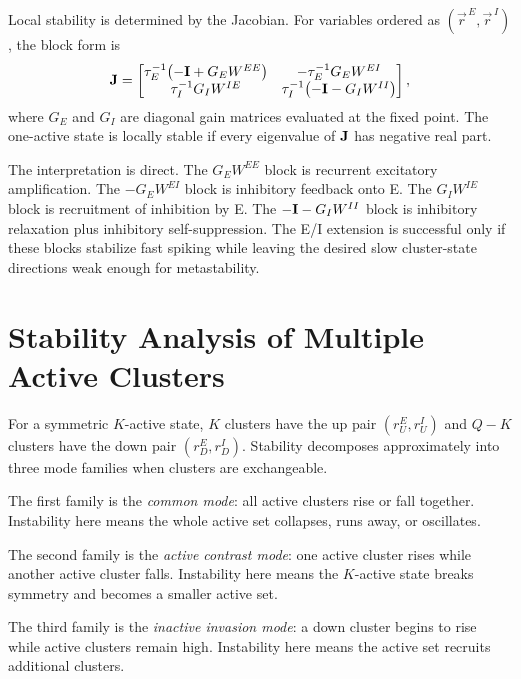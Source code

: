 Local stability is determined by the Jacobian. For variables ordered as $(\vec r^{\,E},\vec r^{\,I})$, the block form is
%
\begin{equation}
  \mathbf{J}
  =
  \begin{bmatrix}
  \tau_E^{-1}\!\left(-\mathbf{I}+G_E W^{EE}\right)
  &
  -\tau_E^{-1}G_E W^{EI}
  \\
  \tau_I^{-1}G_I W^{IE}
  &
  \tau_I^{-1}\!\left(-\mathbf{I}-G_I W^{II}\right)
  \end{bmatrix},
  \label{eq:ei-full-jacobian}
\end{equation}
%
where $G_E$ and $G_I$ are diagonal gain matrices evaluated at the fixed point. The one-active state is locally stable if every eigenvalue of $\mathbf{J}$ has negative real part.

The interpretation is direct. The $G_E W^{EE}$ block is recurrent excitatory amplification. The $-G_E W^{EI}$ block is inhibitory feedback onto E. The $G_I W^{IE}$ block is recruitment of inhibition by E. The $-\mathbf{I}-G_I W^{II}$ block is inhibitory relaxation plus inhibitory self-suppression. The E/I extension is successful only if these blocks stabilize fast spiking while leaving the desired slow cluster-state directions weak enough for metastability.

\section{Stability Analysis of Multiple Active Clusters}
\label{sec:stability-analysis-multiple-active-clusters}

For a symmetric $K$-active state, $K$ clusters have the up pair $(r_U^E,r_U^I)$ and $Q-K$ clusters have the down pair $(r_D^E,r_D^I)$. Stability decomposes approximately into three mode families when clusters are exchangeable.

The first family is the \emph{common mode}: all active clusters rise or fall together. Instability here means the whole active set collapses, runs away, or oscillates.

The second family is the \emph{active contrast mode}: one active cluster rises while another active cluster falls. Instability here means the $K$-active state breaks symmetry and becomes a smaller active set.

The third family is the \emph{inactive invasion mode}: a down cluster begins to rise while active clusters remain high. Instability here means the active set recruits additional clusters.

